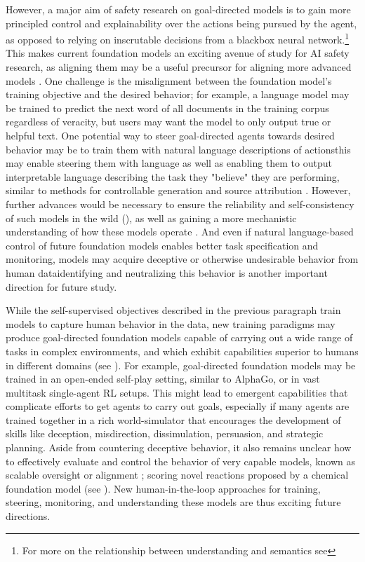 However, a major aim of safety research on goal-directed models is to gain more principled control and explainability over the actions being pursued by the agent, as opposed to relying on inscrutable decisions from a blackbox neural network.\footnote{For more on the relationship between understanding and semantics see } This makes current foundation models an exciting avenue of study for AI safety research, as aligning them may be a useful precursor for aligning more advanced models \citep{christiano2016prosaic, cotra2021narrow, Kenton2021AlignmentOL}. One challenge is the misalignment between the foundation model's training objective and the desired behavior; for example, a language model may be trained to predict the next word of all documents in the training corpus regardless of veracity, but users may want the model to only output true or helpful text. One potential way to steer goal-directed agents towards desired behavior may be to train them with natural language descriptions of actions\dash{}this may enable steering them with language as well as enabling them to output interpretable language describing the task they "believe" they are performing, similar to methods for controllable generation and source attribution \citep[\eg][see also , , and ]{keskar2019ctrl}. However, further advances would be necessary to ensure the reliability and self-consistency of such models in the wild (), as well as gaining a more mechanistic understanding of how these models operate \citep[also see ]{cammarata2020thread}. And even if natural language-based control of future foundation models enables better task specification and monitoring, models may acquire deceptive or otherwise undesirable behavior from human data\dash{}identifying and neutralizing this behavior is another important direction for future study.

While the self-supervised objectives described in the previous paragraph train models to capture human behavior in the data, new training paradigms may produce goal-directed foundation models capable of carrying out a wide range of tasks in complex environments, and which exhibit capabilities superior to humans in different domains (see ). For example, goal-directed foundation models may be trained in an open-ended self-play setting, similar to AlphaGo, or in vast multitask single-agent RL setups. This might lead to emergent capabilities that complicate efforts to get agents to carry out goals, especially if many agents are trained together in a rich world-simulator that encourages the development of skills like deception, misdirection, dissimulation, persuasion, and strategic planning. Aside from countering deceptive behavior, it also remains unclear how to effectively evaluate and control the behavior of very capable models, known as scalable oversight or alignment \citep{amodei2016concrete, Leike2018ScalableAA}; \eg scoring novel reactions proposed by a chemical foundation model (see ). New human-in-the-loop approaches for training, steering, monitoring, and understanding these models are thus exciting future directions.

